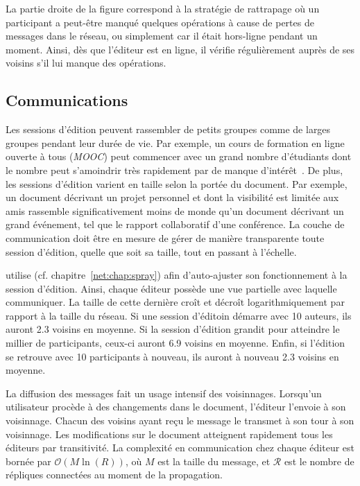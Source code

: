 La partie droite de la figure correspond à la stratégie de rattrapage où un
participant a peut-être manqué quelques opérations à cause de pertes de messages
dans le réseau, ou simplement car il était hors-ligne pendant un moment. Ainsi,
dès que l'éditeur est en ligne, il vérifie régulièrement auprès de ses voisins
s'il lui manque des opérations.


\subsection{Communications}

Les sessions d'édition peuvent rassembler de petits groupes comme de larges
groupes pendant leur durée de vie. Par exemple, un cours de formation en ligne
ouverte à tous (\emph{MOOC}) peut commencer avec un grand nombre d'étudiants
dont le nombre peut s'amoindrir très rapidement par de manque
d'intérêt~\cite{breslow2013studying}. De plus, les sessions d'édition varient en
taille selon la portée du document. Par exemple, un document décrivant un projet
personnel et dont la visibilité est limitée aux amis rassemble significativement
moins de monde qu'un document décrivant un grand événement, tel que le rapport
collaboratif d'une conférence. La couche de communication doit être en mesure de
gérer de manière transparente toute session d'édition, quelle que soit sa
taille, tout en passant à l'échelle.

\CRATE utilise \SPRAY (cf. chapitre~\ref{net:chap:spray}) afin
d'auto-ajuster son fonctionnement à la session d'édition. Ainsi, chaque éditeur
possède une vue partielle avec laquelle communiquer. La taille de cette dernière
croît et décroît logarithmiquement par rapport à la taille du réseau. Si une
session d'éditoin démarre avec 10 auteurs, ils auront 2.3 voisins en moyenne. Si
la session d'édition grandit pour atteindre le millier de participants, ceux-ci
auront 6.9 voisins en moyenne. Enfin, si l'édition se retrouve avec 10
participants à nouveau, ils auront à nouveau 2.3 voisins en moyenne.

La diffusion des messages fait un usage intensif des voisinnages. Lorsqu'un
utilisateur procède à des changements dans le document, l'éditeur l'envoie à son
voisinnage. Chacun des voisins ayant reçu le message le transmet à son tour à
son voisinnage. Les modifications sur le document atteignent rapidement tous les
éditeurs par transitivité. La complexité en communication chez chaque éditeur
est bornée par $\mathcal{O}(M\ln(R))$, où $M$ est la taille du message, et
$\mathcal{R}$ est le nombre de répliques connectées au moment de la propagation.

